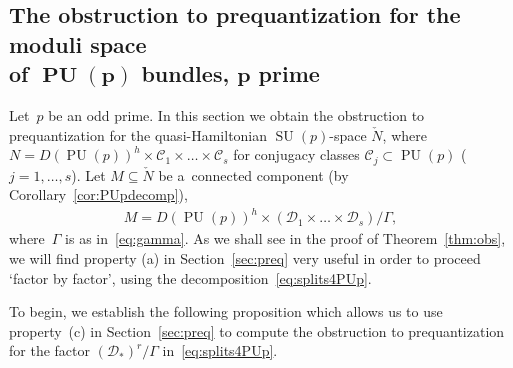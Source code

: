 \documentclass[pdftex]{sigma}
\numberwithin{equation}{section}
\DeclareMathOperator{\SU}{SU}
\DeclareMathOperator{\PU}{PU}
\begin{document}
\subsection[The obstruction to prequantization for the moduli space of $\PU(p)$ bundles, $p$ prime]{The obstruction
to prequantization for the moduli space\\ of $\boldsymbol{\PU(p)}$ bundles, $\boldsymbol{p}$ prime}

Let~$p$ be an odd prime.
In this section we obtain the obstruction to prequantization for the quasi-Hamiltonian $\SU(p)$-space $\check{N}$, where
$N= D(\PU(p))^h \times \mathcal{C}_1 \times \dots \times \mathcal{C}_s $ for conjugacy classes $\mathcal{C}_j \subset
\PU(p)$ ($j=1,\ldots,s$).
Let $M\subseteq \check{N}$ be a~connected component (by Corollary~\ref{cor:PUpdecomp}),
\begin{gather*}
M=D(\PU(p))^h \times \left(\mathcal{D}_1 \times \dots \times \mathcal{D}_s\right)/{\Gamma},
\end{gather*}
where~$\Gamma$ is as in~\eqref{eq:gamma}.
As we shall see in the proof of Theorem~\ref{thm:obs}, we will f\/ind property (a) in Section~\ref{sec:preq} very useful
in order to proceed `factor by factor',
using the decomposition~\eqref{eq:splits4PUp}.

To begin, we establish the following proposition which allows us to use property~(c) in Section~\ref{sec:preq} to
compute the obstruction to prequantization for the factor $(\mathcal{D}_*)^r/\Gamma$ in~\eqref{eq:splits4PUp}.
\end{document}
